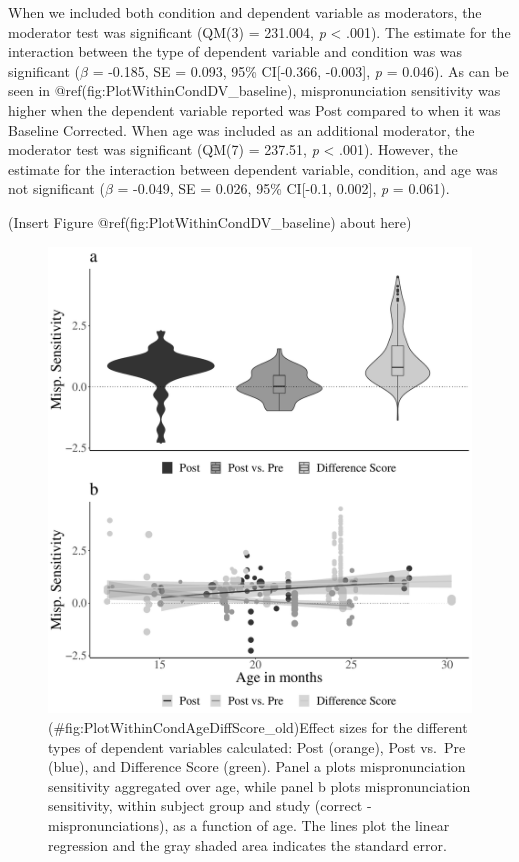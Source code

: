 \documentclass[
  man, noextraspace]{apa6}
\begin{document}
When we included both condition and dependent variable as moderators, the moderator test was significant (QM(3) = 231.004, \emph{p} \textless{} .001). The estimate for the interaction between the type of dependent variable and condition was was significant (\(\beta\) = -0.185, SE = 0.093, 95\% CI{[}-0.366, -0.003{]}, \emph{p} = 0.046). As can be seen in @ref(fig:PlotWithinCondDV\_baseline), mispronunciation sensitivity was higher when the dependent variable reported was Post compared to when it was Baseline Corrected. When age was included as an additional moderator, the moderator test was significant (QM(7) = 237.51, \emph{p} \textless{} .001). However, the estimate for the interaction between dependent variable, condition, and age was not significant (\(\beta\) = -0.049, SE = 0.026, 95\% CI{[}-0.1, 0.002{]}, \emph{p} = 0.061).

(Insert Figure @ref(fig:PlotWithinCondDV\_baseline) about here)

\begin{figure}
\centering
\includegraphics{VonHolzenBergmann_MPMetaAnalysis_files/figure-latex/PlotWithinCondAgeDiffScore_old-1.pdf}
\caption{(\#fig:PlotWithinCondAgeDiffScore\_old)Effect sizes for the different types of dependent variables calculated: Post (orange), Post vs.~Pre (blue), and Difference Score (green). Panel a plots mispronunciation sensitivity aggregated over age, while panel b plots mispronunciation sensitivity, within subject group and study (correct - mispronunciations), as a function of age. The lines plot the linear regression and the gray shaded area indicates the standard error.}
\end{figure}
\end{document}
